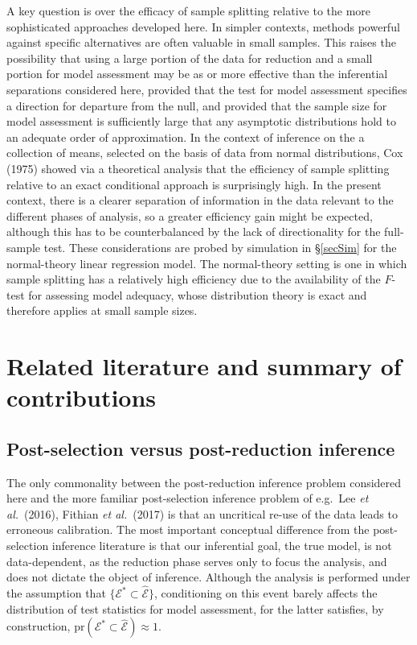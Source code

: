 \documentclass[10pt, reqno]{amsart}
\numberwithin{equation}{section}
\begin{document}
A key question is over the efficacy of sample splitting relative to the more sophisticated approaches developed here. In simpler contexts, methods powerful against specific alternatives are often valuable in small samples. This raises the possibility that using a large portion of the data for reduction and a small portion for model assessment may be as or more effective than the inferential separations considered here, provided that the test for model assessment specifies a direction for departure from the null, and provided that the sample size for model assessment is sufficiently large that any asymptotic distributions hold to an adequate order of approximation. In the context of inference on the a collection of means, selected on the basis of data from normal distributions, Cox (1975) showed via a theoretical analysis that the efficiency of sample splitting relative to an exact conditional approach is surprisingly high. In the present context, there is a clearer separation of information in the data relevant to the different phases of analysis, so a greater efficiency gain might be expected, although this has to be counterbalanced by the lack of directionality for the full-sample test. These considerations are probed by simulation in \S \ref{secSim} for the normal-theory linear regression model. The normal-theory setting is one in which sample splitting has a relatively high efficiency due to the availability of the $F$-test for assessing model adequacy, whose distribution theory is exact and therefore applies at small sample sizes.

\section{Related literature and summary of contributions}\label{secLiterature}

\subsection{Post-selection versus post-reduction inference}\label{secPostSelec}

The only commonality between the post-reduction inference problem considered here and the more familiar post-selection inference problem of e.g.~Lee \emph{et al.}~(2016), Fithian \emph{et al.}~(2017) is that an uncritical re-use of the data leads to erroneous calibration. The most important conceptual difference from the post-selection inference literature is that our inferential goal, the true model, is not data-dependent, as the reduction phase serves only to focus the analysis, and does not dictate the object of inference. Although the analysis is performed under the assumption that $\{\mathcal{E}^* \subset \hat{\mathcal{E}}\}$, conditioning on this event barely affects the distribution of test statistics for model assessment, for the latter satisfies, by construction, $\text{pr}(\mathcal{E}^* \subset \hat{\mathcal{E}})\approx 1$. 
\end{document}

